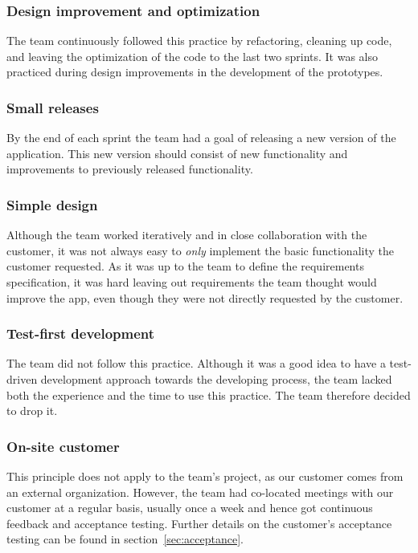 \subsubsection{Design improvement and optimization}
The team continuously followed this practice by refactoring, cleaning up code, and leaving the optimization of the code to the last two sprints. It was also practiced during design improvements in the development of the prototypes.
 
\subsubsection{Small releases}
By the end of each sprint the team had a goal of releasing a new version of the application. This new version should consist of new functionality and improvements to previously released functionality.

\subsubsection{Simple design}
Although the team worked iteratively and in close collaboration with the customer, it was not always easy to \emph{only} implement the basic functionality the customer requested. As it was up to the team to define the requirements specification, it was hard leaving out requirements the team thought would improve the app, even though they were not directly requested by the customer.


\subsubsection{Test-first development}
The team did not follow this practice. Although it was a good idea to have a test-driven development approach towards the developing process, the team lacked both the experience and the time to use this practice. The team therefore decided to drop it.

\subsubsection{On-site customer}
This principle does not apply to the team's project, as our customer comes from an external organization. However, the team had co-located meetings with our customer at a regular basis, usually once a week and hence got continuous feedback and acceptance testing. Further details on the customer's acceptance testing can be found in section~\ref{sec:acceptance}.
